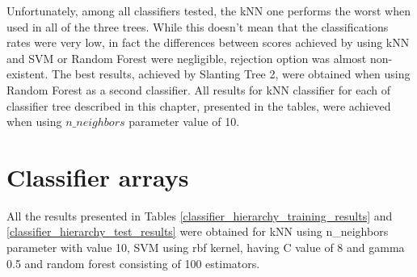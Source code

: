 Unfortunately, among all classifiers tested, the kNN one performs the worst when used in all of the three trees. While this doesn't mean that the classifications rates were very low, in fact the differences between scores achieved by using kNN and SVM or Random Forest were negligible, rejection option was almost non-existent. The best results, achieved by Slanting Tree 2, were obtained when using Random Forest as a second classifier. All results for kNN classifier for each of classifier tree described in this chapter, presented in the tables, were achieved when using $n\_neighbors$ parameter value of 10.

\section{Classifier arrays}

All the results presented in Tables \ref{classifier_hierarchy_training_results} and \ref{classifier_hierarchy_test_results} were obtained for kNN using n\_neighbors parameter with value 10, SVM using rbf kernel, having C value of 8 and gamma 0.5 and random forest consisting of 100 estimators.


